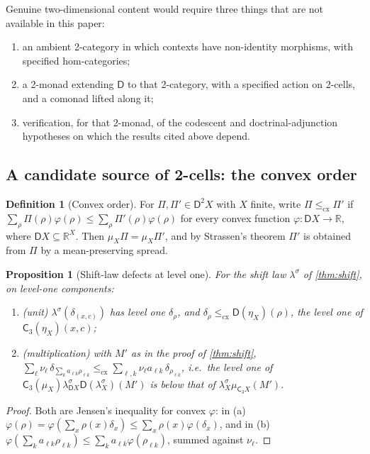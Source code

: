 \documentclass[11pt]{article}
\newtheorem{proposition}[theorem]{Proposition}
\theoremstyle{definition}
\newtheorem{definition}[theorem]{Definition}
\theoremstyle{remark}
\newcommand{\D}{\mathsf{D}}
\newcommand{\C}{\mathsf{C}}
\newcommand{\ls}{\lambda^{\sigma}}
\begin{document}
Genuine two-dimensional content would require three things that are not available in this paper:
\begin{enumerate}[label=(\roman*)]
\item an ambient 2-category in which contexts have non-identity morphisms, with specified
  hom-categories;
\item a 2-monad extending $\D$ to that 2-category, with a specified action on 2-cells, and a
  comonad lifted along it;
\item verification, for that 2-monad, of the codescent and doctrinal-adjunction hypotheses on which
  the results cited above depend.
\end{enumerate}

\subsection{A candidate source of 2-cells: the convex order}\label{sec:cx}

\begin{definition}[Convex order]
For $\Pi,\Pi'\in\D^2X$ with $X$ finite, write $\Pi\le_{\mathrm{cx}}\Pi'$ if
$\sum_\rho\Pi(\rho)\varphi(\rho)\le\sum_\rho\Pi'(\rho)\varphi(\rho)$ for every convex function
$\varphi\colon\D X\to\mathbb{R}$, where $\D X\subseteq\mathbb{R}^X$. Then $\mu_X\Pi=\mu_X\Pi'$, and by
Strassen's theorem \cite{Strassen1965} $\Pi'$ is obtained from $\Pi$ by a mean-preserving spread.
\end{definition}

\begin{proposition}[Shift-law defects at level one]\label{prop:cx}
For the shift law $\ls$ of \cref{thm:shift}, on level-one components:
\begin{enumerate}[label=(\alph*)]
\item (unit) $\ls(\delta_{(x,c)})$ has level one $\delta_\rho$, and
  $\delta_\rho\le_{\mathrm{cx}}\D(\eta_X)(\rho)$, the level one of $\C_3(\eta_X)(x,c)$;
\item (multiplication) with $M'$ as in the proof of \cref{thm:shift},
  $\sum_\ell\nu_\ell\,\delta_{\sum_ka_{\ell k}\rho_{\ell k}}\le_{\mathrm{cx}}
  \sum_{\ell,k}\nu_\ell a_{\ell k}\,\delta_{\rho_{\ell k}}$, i.e.\ the level one of
  $\C_3(\mu_X)\ls_{\D X}\D(\ls_X)(M')$ is below that of $\ls_X\mu_{\C_3X}(M')$.
\end{enumerate}
\end{proposition}
\begin{proof}
Both are Jensen's inequality for convex $\varphi$: in (a)
$\varphi(\rho)=\varphi(\sum_x\rho(x)\delta_x)\le\sum_x\rho(x)\varphi(\delta_x)$, and in (b)
$\varphi(\sum_ka_{\ell k}\rho_{\ell k})\le\sum_ka_{\ell k}\varphi(\rho_{\ell k})$, summed against
$\nu_\ell$.
\end{proof}
\end{document}
